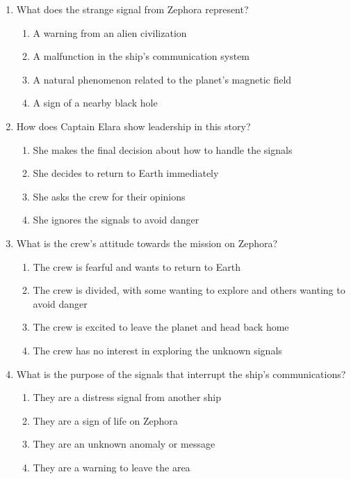 \documentclass[12pt]{article}
\begin{document}
\begin{enumerate}
\vspace{0.5cm}

\item What does the strange signal from Zephora represent?
\begin{enumerate}[label=\Alph*.]
    \item A warning from an alien civilization
    \item A malfunction in the ship's communication system
    \item A natural phenomenon related to the planet’s magnetic field
    \item A sign of a nearby black hole
\end{enumerate}

\vspace{0.5cm}

\item How does Captain Elara show leadership in this story?
\begin{enumerate}[label=\Alph*.]
    \item She makes the final decision about how to handle the signals
    \item She decides to return to Earth immediately
    \item She asks the crew for their opinions
    \item She ignores the signals to avoid danger
\end{enumerate}

\vspace{0.5cm}

\item What is the crew’s attitude towards the mission on Zephora?
\begin{enumerate}[label=\Alph*.]
    \item The crew is fearful and wants to return to Earth
    \item The crew is divided, with some wanting to explore and others wanting to avoid danger
    \item The crew is excited to leave the planet and head back home
    \item The crew has no interest in exploring the unknown signals
\end{enumerate}

\vspace{0.5cm}

\item What is the purpose of the signals that interrupt the ship’s communications?
\begin{enumerate}[label=\Alph*.]
    \item They are a distress signal from another ship
    \item They are a sign of life on Zephora
    \item They are an unknown anomaly or message
    \item They are a warning to leave the area
\end{enumerate}


\end{enumerate}
\end{document}
